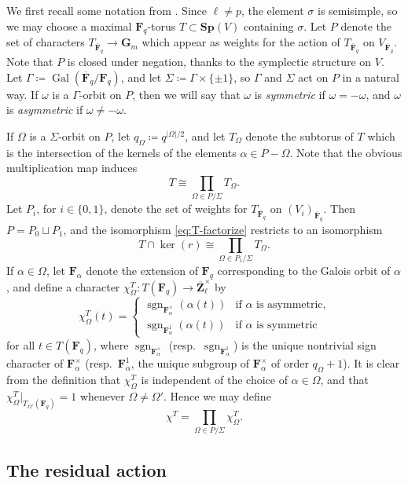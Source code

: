 \documentclass[reqno]{amsart}
\numberwithin{equation}{subsection}
\newcommand{\F}{\mathbf{F}}
\newcommand{\G}{\mathbf{G}}
\newcommand{\Z}{\mathbf{Z}}
\newcommand{\sgn}{\operatorname{sgn}}
\newcommand{\Gal}{\operatorname{Gal}}
\newcommand{\ol}[1]{\overline{#1}}
\theoremstyle{remark}
\numberwithin{equation}{subsection}
\numberwithin{figure}{subsection}
\begin{document}
We first recall some notation from \cite[\S 4]{Ger77}. Since $\ell \neq p$, the element $\sigma$ is semisimple, so we may choose a maximal $\F_q$-torus $T\subset\mathbf{Sp}(V)$ containing $\sigma$. Let $P$ denote the set of characters $T_{\ol\F_q} \to \G_m$ which appear as weights for the action of $T_{\ol\F_q}$ on $V_{\ol\F_q}$. Note that $P$ is closed under negation, thanks to the symplectic structure on $V$. Let $\Gamma \coloneqq \Gal(\ol\F_q/\F_q)$, and let $\Sigma \coloneqq \Gamma \times \{\pm 1\}$, so $\Gamma$ and $\Sigma$ act on $P$ in a natural way. If $\omega$ is a $\Gamma$-orbit on $P$, then we will say that $\omega$ is \textit{symmetric} if $\omega = -\omega$, and $\omega$ is \textit{asymmetric} if $\omega \neq -\omega$.

If $\Omega$ is a $\Sigma$-orbit on $P$, let $q_\Omega \coloneqq q^{|\Omega|/2}$, and let $T_\Omega$ denote the subtorus of $T$ which is the intersection of the kernels of the elements $\alpha \in P - \Omega$. Note that the obvious multiplication map induces 
\begin{equation}\label{eq:T-factorize}
T \cong \prod_{\Omega \in P/\Sigma} T_\Omega.
\end{equation}
Let $P_i$, for $i \in \{0,1\}$, denote the set of weights for $T_{\ol\F_q}$ on $(V_i)_{\ol\F_q}$. Then $P = P_0 \sqcup P_1$, and the isomorphism \eqref{eq:T-factorize} restricts to an isomorphism
\[
T \cap \ker(r) \cong \prod_{\Omega \in P_1/\Sigma} T_\Omega.
\]
If $\alpha \in \Omega$, let $\F_\alpha$ denote the extension of $\F_q$ corresponding to the Galois orbit of $\alpha$, and define a character $\chi_\Omega^T\colon T(\F_q) \to \ol\Z_\ell^\times$ by
\[
\chi_\Omega^T(t) = \begin{cases}
\sgn_{\F_\alpha^\times}(\alpha(t)) &\text{if } \alpha \text{ is asymmetric,} \\
\sgn_{\F_\alpha^1}(\alpha(t)) &\text{if } \alpha \text{ is symmetric}
\end{cases}
\]
for all $t \in T(\F_q)$, where $\sgn_{\F_\alpha^\times}$ (resp.\ $\sgn_{\F_\alpha^1}$) is the unique nontrivial sign character of $\F_\alpha^\times$ (resp.\ $\F_\alpha^1$, the unique subgroup of $\F_\alpha^\times$ of order $q_\Omega+1$). It is clear from the definition that $\chi_\Omega^T$ is independent of the choice of $\alpha \in \Omega$, and that $\chi_\Omega^T|_{T_{\Omega'}(\F_q)} = 1$ whenever $\Omega \neq \Omega'$. Hence we may define
\[
\chi^T = \prod_{\Omega \in P/\Sigma} \chi_\Omega^T.
\]

\subsection{The residual action}
\end{document}
